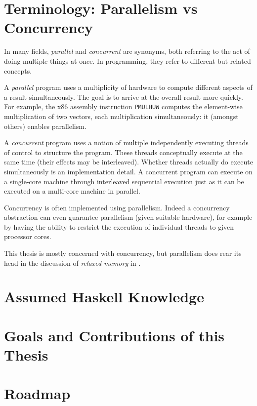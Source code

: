 \blindtext

\section{Terminology: Parallelism vs Concurrency}
\label{sec:intro-parconc}

In many fields, \emph{parallel} and \emph{concurrent} are synonyms, both referring to the act of
doing multiple things at once.  In programming, they refer to different but related concepts.

A \emph{parallel} program uses a multiplicity of hardware to compute different aspects of a result
simultaneously.  The goal is to arrive at the overall result more quickly.  For example, the x86
assembly instruction \verb#PMULHUW# computes the element-wise multiplication of two vectors, each
multiplication simultaneously: it (amongst others) enables parallelism.

A \emph{concurrent} program uses a notion of multiple independently executing threads of control to
structure the program.  These threads conceptually execute at the same time (their effects may be
interleaved).  Whether threads actually do execute simultaneously is an implementation detail.  A
concurrent program can execute on a single-core machine through interleaved sequential execution
just as it can be executed on a multi-core machine in parallel.

Concurrency is often implemented using parallelism.  Indeed a concurrency abstraction can even
guarantee parallelism (given suitable hardware), for example by having the ability to restrict the
execution of individual threads to given processor cores.

This thesis is mostly concerned with concurrency, but parallelism does rear its head in the
discussion of \emph{relaxed memory} in .

\section{Assumed Haskell Knowledge}
\label{sec:intro-assumed}
\blindtext

\section{Goals and Contributions of this Thesis}
\label{sec:intro-contributions}
\blindtext

\section{Roadmap}
\label{sec:intro-roadmap}

